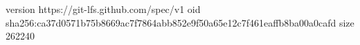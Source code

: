 version https://git-lfs.github.com/spec/v1
oid sha256:ca37d0571b75b8669ac7f7864abb852e9f50a65e12c7f461eaffb8ba00a0cafd
size 262240
